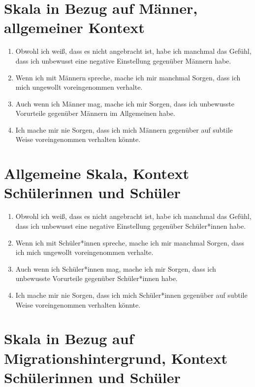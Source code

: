 \section*{Skala in Bezug auf Männer, allgemeiner Kontext}
\label{app:skala-maenner-allg}

\begin{enumerate}
	\item Obwohl ich weiß, dass es nicht angebracht ist, habe ich manchmal das Gefühl, dass ich unbewusst eine negative Einstellung gegenüber Männern habe.
	
	\item Wenn ich mit Männern spreche, mache ich mir manchmal Sorgen, dass ich mich ungewollt voreingenommen verhalte.
	
	\item Auch wenn ich Männer mag, mache ich mir Sorgen, dass ich unbewusste Vorurteile gegenüber Männern im Allgemeinen habe.
	
	\item Ich mache mir nie Sorgen, dass ich mich Männern gegenüber auf subtile Weise voreingenommen verhalten könnte.
\end{enumerate}


\section*{Allgemeine Skala, Kontext Schülerinnen und Schüler}
\label{app:skala-allg-sus}

\begin{enumerate}
	\item Obwohl ich weiß, dass es nicht angebracht ist, habe ich manchmal das Gefühl, dass ich unbewusst eine negative Einstellung gegenüber Schüler*innen habe.
	
	\item Wenn ich mit Schüler*innen spreche, mache ich mir manchmal Sorgen, dass ich mich ungewollt voreingenommen verhalte.
	
	\item Auch wenn ich Schüler*innen mag, mache ich mir Sorgen, dass ich unbewusste Vorurteile gegenüber Schüler*innen habe.
	
	\item Ich mache mir nie Sorgen, dass ich mich Schüler*innen gegenüber auf subtile Weise voreingenommen verhalten könnte.
\end{enumerate}


\section*{Skala in Bezug auf Migrationshintergrund, Kontext Schülerinnen und Schüler}
\label{app:skala-migr-sus}


